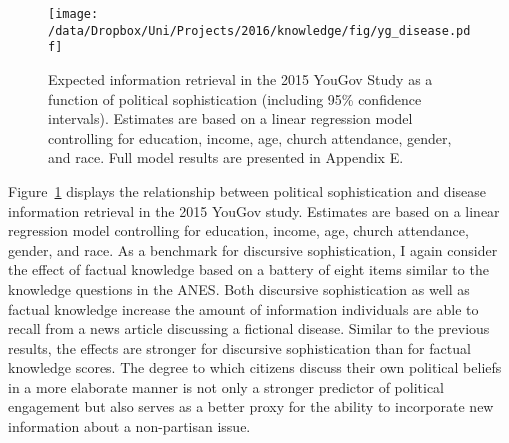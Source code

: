\begin{figure}[h]\centering
\texttt{[image: /data/Dropbox/Uni/Projects/2016/knowledge/fig/yg\_disease.pdf]}
\caption{Expected information retrieval in the 2015 YouGov Study as a function of political sophistication (including 95\% confidence intervals). Estimates are based on a linear regression model controlling for education, income, age, church attendance, gender, and race. Full model results are presented in Appendix E.}\label{fig:yg_disease}
\end{figure}

Figure~\ref{fig:yg_disease} displays the relationship between political sophistication and disease information retrieval in the 2015 YouGov study. Estimates are based on a linear regression model controlling for education, income, age, church attendance, gender, and race. As a benchmark for discursive sophistication, I again consider the effect of factual knowledge based on a battery of eight items similar to the knowledge questions in the ANES. Both discursive sophistication as well as factual knowledge increase the amount of information individuals are able to recall from a news article discussing a fictional disease. Similar to the previous results, the effects are stronger for discursive sophistication than for factual knowledge scores. The degree to which citizens discuss their own political beliefs in a more elaborate manner is not only a stronger predictor of political engagement but also serves as a better proxy for the ability to incorporate new information about a non-partisan issue.


